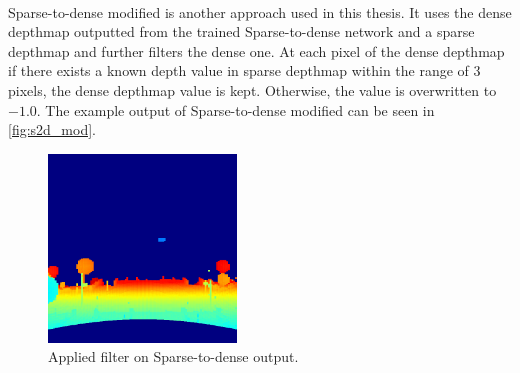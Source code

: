 \documentclass[twoside]{ctuthesis}
\theoremstyle{plain}
\theoremstyle{definition}
\theoremstyle{note}
\begin{document}
\\
Sparse-to-dense modified is another approach used in this thesis. It uses the dense depthmap outputted from the trained Sparse-to-dense network and a sparse depthmap and further filters the dense one. At each pixel of the dense depthmap if there exists a known depth value in sparse depthmap within the range of 3 pixels, the dense depthmap value is kept. Otherwise, the value is overwritten to $-1.0$. The example output of Sparse-to-dense modified can be seen in \autoref{fig:s2d_mod}.
\begin{figure}
	\centering
	\includegraphics[width=5cm]{sparse2dense_filter.png}
	\caption{Applied filter on Sparse-to-dense output.}
	\label{fig:s2d_mod}
\end{figure}
\end{document}
